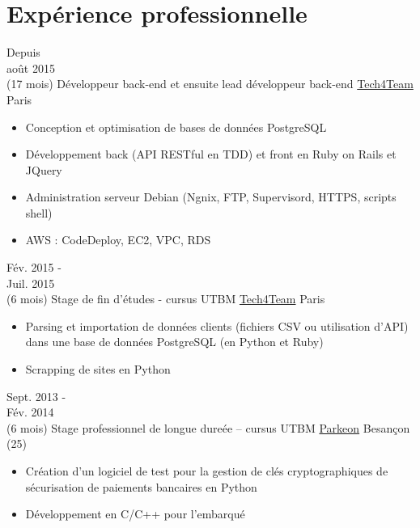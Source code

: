 \documentclass[letterpaper]{twentysecondcv} %
\begin{document}
\makeprofile %

\section{Expérience professionnelle}
\begin{twenty}
	\twentyitem
    	{Depuis \\ août 2015 \\ (17 mois)}
        {Développeur back-end et ensuite lead développeur back-end}
        {\href{http://www.tech4team.fr}{Tech4Team}}
        {Paris}
        {
        {\begin{itemize}
        	\item Conception et optimisation de bases de données PostgreSQL
	        \item Développement back (API RESTful en TDD) et front en Ruby on Rails et JQuery
	        \item Administration serveur Debian (Ngnix, FTP, Supervisord, HTTPS, scripts shell)
	        \item AWS : CodeDeploy, EC2, VPC, RDS
	    \end{itemize}}
        }
    \twentyitem
    	{Fév. 2015 - \\ Juil. 2015 \\ (6 mois)}
        {Stage de fin d'études - cursus UTBM}
        {\href{http://www.tech4team.fr}{Tech4Team}}
        {Paris}
        {
        {\begin{itemize}
        	\item Parsing et importation de données clients (fichiers CSV ou utilisation d'API) dans une base de données PostgreSQL (en Python et Ruby)
	        \item Scrapping de sites en Python
	    \end{itemize}}
        }
     \twentyitem
    	{Sept. 2013 - \\ Fév. 2014 \\ (6 mois)}
        {Stage professionnel de longue dureée – cursus UTBM}
        {\href{http://parkeon.fr}{Parkeon}}
        {Besançon (25)}
        {
        {\begin{itemize}
        	\item Création d'un logiciel de test pour la gestion de clés cryptographiques de sécurisation de paiements bancaires en Python
	        \item Développement en C/C++ pour l’embarqué
	    \end{itemize}}
        }
\end{twenty}
\end{document}
